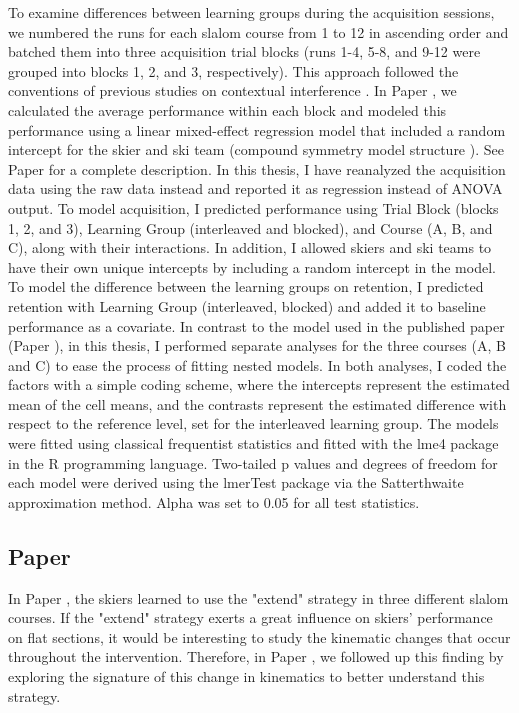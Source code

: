 To examine differences between learning groups during the acquisition sessions, we numbered the runs for each slalom course from 1 to 12 in ascending order and batched them into three acquisition trial blocks (runs 1-4, 5-8, and 9-12 were grouped into blocks 1, 2, and 3, respectively). This approach followed the conventions of previous studies on contextual interference \cite{shea_contextual_1979, lee_locus_1983}. In Paper , we calculated the average performance within each block and modeled this performance using a linear mixed-effect regression model that included a random intercept for the skier and ski team (compound symmetry model structure \cite{long_longitudinal_2012}). See Paper  for a complete description. In this thesis, I have reanalyzed the acquisition data using the raw data instead and reported it as regression instead of ANOVA output. To model acquisition, I predicted performance using Trial Block (blocks 1, 2, and 3), Learning Group (interleaved and blocked), and Course (A, B, and C), along with their interactions. In addition, I allowed skiers and ski teams to have their own unique intercepts by including a random intercept in the model. To model the difference between the learning groups on retention, I predicted retention with Learning Group (interleaved, blocked) and added it to baseline performance as a covariate. In contrast to the model used in the published paper (Paper ), in this thesis, I performed separate analyses for the three courses (A, B and C) to ease the process of fitting nested models. In both analyses, I coded the factors with a simple coding scheme, where the intercepts represent the estimated mean of the cell means, and the contrasts represent the estimated difference with respect to the reference level, set for the interleaved learning group. The models were fitted using classical frequentist statistics and fitted with the lme4 package \cite{bates_fitting_2015} in the R \cite{r_core_team_r_2022} programming language. Two-tailed p values and degrees of freedom for each model were derived using the lmerTest package \cite{kuznetsova_lmertest_2017} via the Satterthwaite approximation method. Alpha was set to 0.05 for all test statistics.

\subsection{Paper }
In Paper , the skiers learned to use the "extend" strategy in three different slalom courses. If the "extend" strategy exerts a great influence on skiers' performance on flat sections, it would be interesting to study the kinematic changes that occur throughout the intervention. Therefore, in Paper , we followed up this finding by exploring the signature of this change in kinematics to better understand this strategy. 

